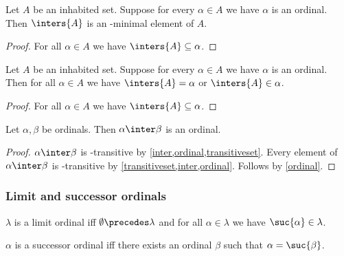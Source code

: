 \begin{proposition}\label{inters_of_ordinals_is_minimal}
    Let $A$ be an inhabited set.
    Suppose for every $\alpha\in A$ we have $\alpha$ is an ordinal.
    Then $\inters{A}$ is an \in-minimal element of $A$.
\end{proposition}
\begin{proof}
    For all $\alpha\in A$ we have $\inters{A}\subseteq \alpha$.
\end{proof}

\begin{proposition}\label{inters_of_ordinals_is_minimal_alternate}
    Let $A$ be an inhabited set.
    Suppose for every $\alpha\in A$ we have $\alpha$ is an ordinal.
    Then for all $\alpha\in A$ we have $\inters{A} = \alpha$ or $\inters{A}\in\alpha$.
\end{proposition}
\begin{proof}
    For all $\alpha\in A$ we have $\inters{A}\subseteq \alpha$.
\end{proof}

\begin{proposition}\label{inter_of_two_ordinals_is_ordinal}
    Let $\alpha,\beta$ be ordinals.
    Then $\alpha\inter\beta$ is an ordinal.
    \end{proposition}
\begin{proof}
    $\alpha\inter\beta$ is \in-transitive by \cref{inter,ordinal,transitiveset}.
    Every element of $\alpha\inter\beta$ is \in-transitive
        by \cref{transitiveset,inter,ordinal}.
    Follows by \cref{ordinal}.
\end{proof}


\subsubsection{Limit and successor ordinals}


\begin{definition}\label{limit_ordinal}
    $\lambda$ is a limit ordinal iff
    $\emptyset\precedes \lambda$ %
    and for all $\alpha\in \lambda$ we have $\suc{\alpha}\in \lambda$.
\end{definition}

\begin{definition}\label{successor_ordinal}
    $\alpha$ is a successor ordinal iff
    there exists an ordinal $\beta$ such that $\alpha = \suc{\beta}$.
\end{definition}

